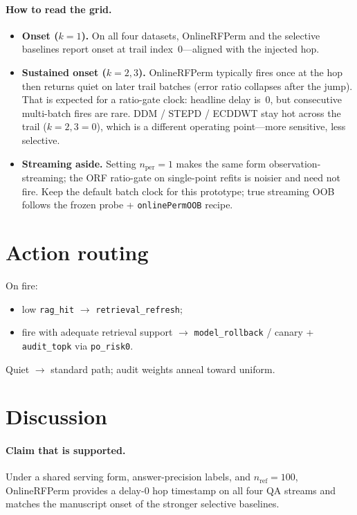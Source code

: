 \documentclass[11pt]{article}
\begin{document}
\paragraph{How to read the grid.}
\begin{itemize}[leftmargin=1.2em]
\item \textbf{Onset ($k=1$).}
On all four datasets, OnlineRFPerm and the selective baselines report onset at
trail index~$0$---aligned with the injected hop.
\item \textbf{Sustained onset ($k=2,3$).}
OnlineRFPerm typically fires once at the hop then returns quiet on later trail
batches (error ratio collapses after the jump). That is expected for a
ratio-gate clock: headline delay is~$0$, but consecutive multi-batch fires are
rare. DDM / STEPD / ECDDWT stay hot across the trail ($k=2,3=0$), which is a
different operating point---more sensitive, less selective.
\item \textbf{Streaming aside.}
Setting $n_{\mathrm{per}}=1$ makes the same form observation-streaming; the
ORF ratio-gate on single-point refits is noisier and need not fire. Keep the
default batch clock for this prototype; true streaming OOB follows the frozen
probe + \texttt{onlinePermOOB} recipe.
\end{itemize}

\section{Action routing}
On fire:
\begin{itemize}[leftmargin=1.2em]
\item low \texttt{rag\_hit} $\to$ \texttt{retrieval\_refresh};
\item fire with adequate retrieval support $\to$
\texttt{model\_rollback} / canary + \texttt{audit\_topk} via \texttt{po\_risk0}.
\end{itemize}
Quiet $\to$ standard path; audit weights anneal toward uniform.

\section{Discussion}
\paragraph{Claim that is supported.}
Under a shared serving form, answer-precision labels, and $n_{\mathrm{ref}}=100$,
OnlineRFPerm provides a delay-$0$ hop timestamp on all four QA streams and
matches the manuscript onset of the stronger selective baselines.
\end{document}
